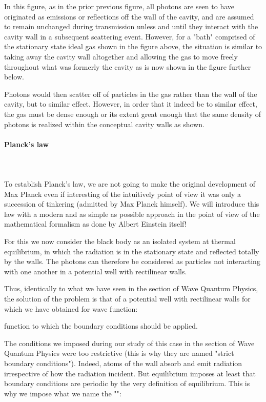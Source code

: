 	In this figure, as in the prior previous figure, all photons are seen to have originated as emissions or reflections off the wall of the cavity, and are assumed to remain unchanged during transmission unless and until they interact with the cavity wall in a subsequent scattering event. However, for a "bath" comprised of the stationary state ideal gas shown in the figure above, the situation is similar to taking away the cavity wall altogether and allowing the gas to move freely throughout what was formerly the cavity as is now shown in the figure further below.
	
	Photons would then scatter off of particles in the gas rather than the wall of the cavity, but to similar effect.  However, in order that it indeed be to similar effect, the gas must be dense enough or its extent great enough that the same density of photons is realized within the conceptual cavity walls as shown.
	
	\pagebreak
	\paragraph{Planck's law}\mbox{}\\\\
	To establish Planck's law, we are not going to make the original development of Max Planck even if interesting of the intuitively point of view it was only a succession of tinkering (admitted by Max Planck himself). We will introduce this law with a modern and as simple as possible approach in the point of view of the mathematical formalism as done by Albert Einstein itself!

	For this we now consider the black body as an isolated system at thermal equilibrium, in which the radiation is in the stationary state and reflected totally by the walls. The photons can therefore be considered as particles not interacting with one another in a potential well with rectilinear walls.

	Thus, identically to what we have seen in the section of Wave Quantum Physics, the solution of the problem is that of a potential well with rectilinear walls for which we have obtained for wave function:
	
	function to which the boundary conditions should be applied.

	The conditions we imposed during our study of this case in the section of Wave Quantum Physics were too restrictive (this is why they are named "strict boundary conditions"). Indeed, atoms of the wall absorb and emit radiation irrespective of how the radiation incident. But equilibrium imposes at least that boundary conditions are periodic by the very definition of equilibrium. This is why we impose what we name the "":

